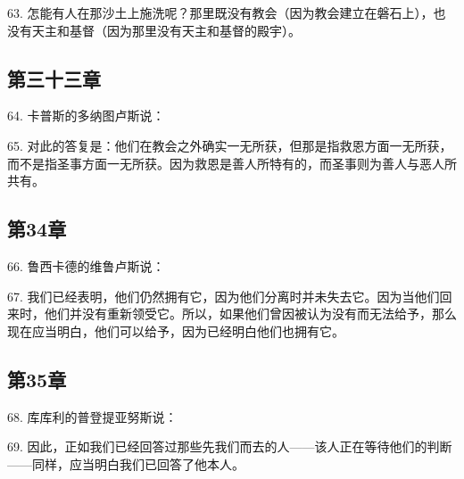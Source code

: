 63. 怎能有人在那沙土上施洗呢？那里既没有教会（因为教会建立在磐石上），也没有天主和基督（因为那里没有天主和基督的殿宇）。\par


\subsection{第三十三章}

64. 卡普斯的多纳图卢斯说：\par

65. 对此的答复是：他们在教会之外确实一无所获，但那是指救恩方面一无所获，而不是指圣事方面一无所获。因为救恩是善人所特有的，而圣事则为善人与恶人所共有。\par


\subsection{第34章}

66. 鲁西卡德的维鲁卢斯说：\par

67. 我们已经表明，他们仍然拥有它，因为他们分离时并未失去它。因为当他们回来时，他们并没有重新领受它。所以，如果他们曾因被认为没有而无法给予，那么现在应当明白，他们可以给予，因为已经明白他们也拥有它。\par


\subsection{第35章}

68. 库库利的普登提亚努斯说：\par

69. 因此，正如我们已经回答过那些先我们而去的人——该人正在等待他们的判断——同样，应当明白我们已回答了他本人。\par

